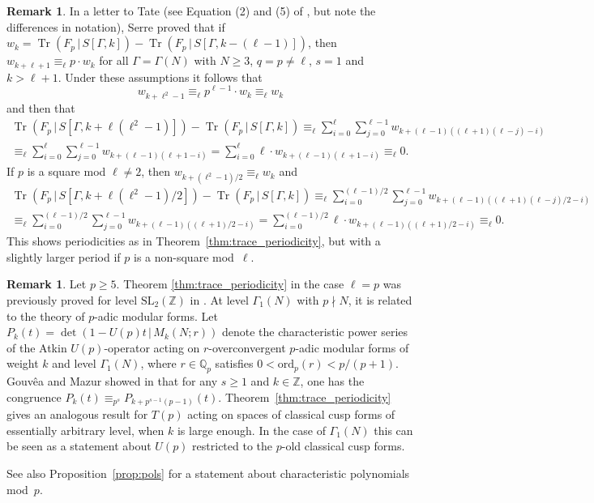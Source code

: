 \documentclass[10pt]{article}
\theoremstyle{definition}
\newtheorem{remark}[theorem]{Remark}
\DeclareMathOperator\Tr{Tr}
\renewcommand{\:}{\colon}
\begin{document}
\begin{remark} 
    In a letter to Tate (see Equation (2) and (5) of \cite{serreletter}, but note the differences in notation), Serre proved that if $w_k=\Tr(F_p \,|\, S[\Gamma,k])-\Tr(F_p \,|\, S[\Gamma,k-(\ell-1)])$, then $w_{k+\ell+1} \equiv_{\ell} p \cdot w_k$ for all $\Gamma=\Gamma(N)$ with $N \geq 3$, $q=p \neq \ell$, $s=1$ and $k>\ell+1$. Under these assumptions it follows that 
    \[w_{k+\ell^2-1}  \equiv_{\ell} p^{\ell-1} \cdot w_k \equiv_{\ell} w_k
    \]
    and then that
   \begin{multline*}
   \Tr(F_p \,|\, S[\Gamma,k+\ell(\ell^2-1)])-\Tr(F_p\,|\, S[\Gamma,k])\equiv_{\ell} \sum_{i=0}^{\ell} \sum_{j=0}^{\ell-1} w_{k+(\ell-1)((\ell+1)(\ell-j)-i)} \\ \equiv_{\ell} \sum_{i=0}^{\ell} \sum_{j=0}^{\ell-1} w_{k+(\ell-1)(\ell+1-i)}=\sum_{i=0}^{\ell}\ell \cdot w_{k+(\ell-1)(\ell+1-i)}\equiv_{\ell} 0.
   \end{multline*}
    If $p$ is a square mod $\ell \neq 2$, then $w_{k+(\ell^2-1)/2}  \equiv_{\ell} w_k$ and
    \begin{multline*}
   \Tr(F_p \,|\, S[\Gamma,k+\ell(\ell^2-1)/2])-\Tr(F_p\,|\, S[\Gamma,k])\equiv_{\ell} \sum_{i=0}^{(\ell-1)/2} \sum_{j=0}^{\ell-1} w_{k+(\ell-1)((\ell+1)(\ell-j)/2-i)} \\ \equiv_{\ell} \sum_{i=0}^{(\ell-1)/2} \sum_{j=0}^{\ell-1} w_{k+(\ell-1)((\ell+1)/2-i)}=\sum_{i=0}^{(\ell-1)/2}\ell \cdot w_{k+(\ell-1)((\ell+1)/2-i)}\equiv_{\ell} 0.
   \end{multline*}
    This shows periodicities as in Theorem~\ref{thm:trace_periodicity}, but with a slightly larger period if $p$ is a non-square mod~$\ell$. 
\end{remark}

\begin{remark} \label{rmk:padic}
    Let $p \geq 5$. Theorem \ref{thm:trace_periodicity} in the case $\ell=p$ was previously proved for level $\mathrm{SL}_2(\mathbb Z)$ in \cite{koike,adolphson}. At level $\Gamma_1(N)$ with $p \nmid N$, it is related to the theory of $p$-adic modular forms. Let $P_k(t) = \det(1-U(p)t \, | \, M_k(N;r))$ denote the characteristic power series of the Atkin $U(p)$-operator acting on $r$-overconvergent $p$-adic modular forms of weight $k$ and level $\Gamma_1(N)$, where $r \in \mathbb Q_p$ satisfies $0 < \text{ord}_p(r) < p/(p+1)$. 
    Gouv\^ea and Mazur showed in \cite[Theorem~1]{GM} that for any $s \geq 1$ and $k \in \mathbb Z$, one has the congruence $P_k(t) \equiv_{p^s} P_{k+p^{s-1}(p-1)}(t)$. Theorem~\ref{thm:trace_periodicity} gives an analogous result for $T(p)$ acting on spaces of classical cusp forms of essentially arbitrary level, when $k$ is large enough. In the case of $\Gamma_1(N)$ this can be seen as a statement about $U(p)$ restricted to the $p$-old classical cusp forms.
    
    See also Proposition~\ref{prop:pols} for a statement about characteristic polynomials mod~$p$.
\end{remark}
\end{document}
